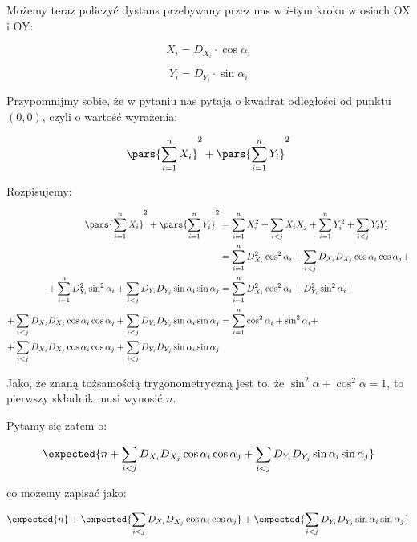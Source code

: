 Możemy teraz policzyć dystans przebywany przez nas w \(i\)-tym kroku w osiach OX i OY:

\[
	X_i = D_{X_i} \cdot \cos{\alpha_i}
\]

\[
	Y_i = D_{Y_i} \cdot \sin{\alpha_i}
\]

Przypomnijmy sobie, że w pytaniu nas pytają o kwadrat odległości od punktu \((0, 0)\), czyli o wartość wyrażenia:

\[
	\pars{\sum_{i=1}^{n} X_i}^2 + \pars{\sum_{i=1}^{n} Y_i}^2
\]

Rozpisujemy:

\begin{align*}
	\pars{\sum_{i=1}^{n} X_i}^2 + \pars{\sum_{i=1}^{n} Y_i}^2                                                                & = \sum_{i=1}^{n} X_{i}^2 + \sum_{i < j} X_{i}X_{j} + \sum_{i=1}^{n} Y_{i}^2 + \sum_{i < j} Y_{i} Y_{j}    \\
	                                                                                                                         & = \sum_{i=1}^{n} D_{X_i}^2 \cos^2{\alpha_i} + \sum_{i < j} D_{X_i}D_{X_j} \cos{\alpha_i} \cos{\alpha_j} + \\ + \sum_{i=1}^{n} D_{Y_i}^2 \sin^2{\alpha_i} + \sum_{i < j} D_{Y_i} D_{Y_j} \sin{\alpha_i} \sin{\alpha_j}
	                                                                                                                         & = \sum_{i=1}^{n} D_{X_i}^2 \cos^2{\alpha_i} + D_{Y_i}^2 \sin^2{\alpha_i} +                                \\
	+ \sum_{i < j} D_{X_i}D_{X_j} \cos{\alpha_i} \cos{\alpha_j} + \sum_{i < j} D_{Y_i} D_{Y_j} \sin{\alpha_i} \sin{\alpha_j} & = \sum_{i=1}^{n} \cos^2{\alpha_i} + \sin^2{\alpha_i} +                                                    \\
	+ \sum_{i < j} D_{X_i}D_{X_j} \cos{\alpha_i} \cos{\alpha_j} + \sum_{i < j} D_{Y_i} D_{Y_j} \sin{\alpha_i} \sin{\alpha_j}
\end{align*}

Jako, że znaną tożsamością trygonometryczną jest to, że \(\sin^2{\alpha} + \cos^2{\alpha} = 1\), to pierwszy składnik musi wynosić \(n\).

Pytamy się zatem o:

\[
	\expected{n + \sum_{i < j} D_{X_i}D_{X_j} \cos{\alpha_i} \cos{\alpha_j} + \sum_{i < j} D_{Y_i} D_{Y_j} \sin{\alpha_i} \sin{\alpha_j}}
\]

co możemy zapisać jako:

\[
	\expected{n} + \expected{\sum_{i < j} D_{X_i}D_{X_j} \cos{\alpha_i} \cos{\alpha_j} } + \expected{\sum_{i < j} D_{Y_i} D_{Y_j} \sin{\alpha_i} \sin{\alpha_j}}
\]

